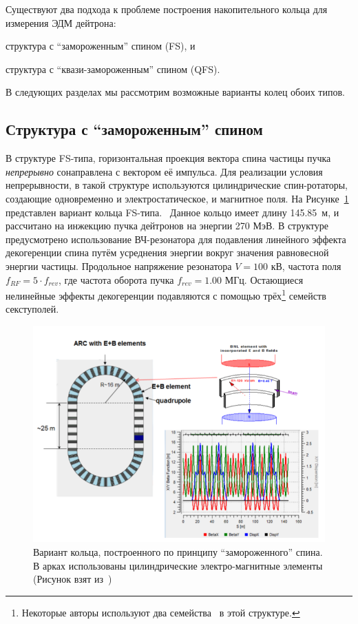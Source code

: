 
Существуют два подхода к проблеме построения накопительного кольца для измерения ЭДМ дейтрона: 
\begin{enumerate*}
	\item структура с ``замороженным'' спином (FS), и 
	\item структура с ``квази-замороженным'' спином (QFS).
\end{enumerate*}

В следующих разделах мы рассмотрим возможные варианты колец обоих типов.

\subsection{Структура с ``замороженным'' спином} \label{chpt2:lattice:FS_BNL}
В структуре FS-типа, горизонтальная проекция вектора спина частицы пучка \emph{непрерывно} сонаправлена с вектором её импульса. Для реализации условия непрерывности, в такой структуре используются цилиндрические спин-ротаторы, создающие одновременно и электростатическое, и магнитное поля. На Рисунке~\ref{fig:BNL_lattice} представлен вариант кольца FS-типа.~\cite{Senichev:Lattices} Данное кольцо имеет длину 145.85~м, и рассчитано на инжекцию пучка дейтронов на энергии 270 МэВ. В структуре предусмотрено использование ВЧ-резонатора для подавления линейного эффекта декогеренции спина путём усреднения энергии вокруг значения равновесной энергии частицы. Продольное напряжение резонатора $V = 100$ кВ, частота поля $f_{RF} = 5\cdot f_{rev}$, где частота оборота пучка $f_{rev} = 1.00$ МГц. Остающиеся нелинейные эффекты декогеренции подавляются с помощью трёх\footnote{Некоторые авторы используют
два семейства~\cite{Eremey:Thesis} в этой структуре.} семейств секступолей.

\begin{figure}[h!]
	\centering
	\includegraphics[width=\linewidth]{images/chapter2/BNL_lattice}
	\caption{Вариант кольца, построенного по принципу ``замороженного'' спина. В арках использованы цилиндрические электро-магнитные элементы (Рисунок взят из~\cite{Senichev:Lattices})\label{fig:BNL_lattice}}
\end{figure}

